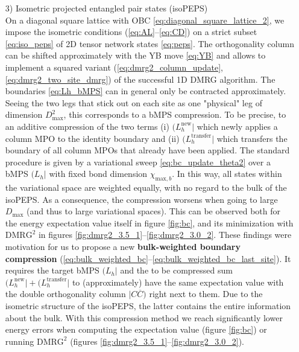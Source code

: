 \begin{enumerate}
	\newpage
	\item[3)] Isometric projected entangled pair states (isoPEPS) \\[0.3em]
	On a diagonal square lattice with OBC \eqref{eq:diagonal_square_lattice_2}, we impose the isometric conditions (\ref{eq:AL}--\ref{eq:CD}) on a strict subset \eqref{eq:iso_peps} of 2D tensor network states \eqref{eq:peps}. The orthogonality column can be shifted approximately with the YB move \eqref{eq:YB} and allows to implement a squared variant (\ref{eq:dmrg2_column_update}, \ref{eq:dmrg2_two_site_dmrg}) of the successful 1D DMRG algorithm. The boundaries \eqref{eq:Lh_bMPS} can in general only be contracted approximately. Seeing the two legs that stick out on each site as one "physical" leg of dimension $D_{\text{max}}^2$, this corresponds to a bMPS compression. To be precise, to an additive compression of the two terms (i) $(L_h^{\text{new}} \vert$ which newly applies a column MPO to the identity boundary and (ii) $(L_h^{\text{transfer}} \vert$ which transfers the boundary of all column MPOs that already have been applied. The standard procedure is given by a variational sweep \eqref{eq:bc_update_theta2} over a bMPS $( L_h \vert$ with fixed bond dimension $\chi_{\text{max},b}$. In this way, all states within the variational space are weighted equally, with no regard to the bulk of the isoPEPS. As a consequence, the compression worsens when going to large $D_{\text{max}}$ (and thus to large variational spaces). This can be observed both for the energy expectation value itself in figure \ref{fig:bc}, and its minimization with $\text{DMRG}^2$ in figures \ref{fig:dmrg2_3.5_1}--\ref{fig:dmrg2_3.0_2}. These findings were motivation for us to propose a new \textbf{bulk-weighted boundary compression} (\ref{eq:bulk_weighted_bc}--\ref{eq:bulk_weighted_bc_last_site}). It requires the target bMPS $( L_h \vert$ and the to be compressed sum $(L_h^{\text{new}} \vert + (L_h^{\text{transfer}} \vert$ to (approximately) have the same expectation value with the double orthogonality column $\vert C \overline{C} )$ right next to them. Due to the isometric structure of the isoPEPS, the latter contains the entire information about the bulk. With this compression method we reach significantly lower energy errors when computing the expectation value (figure \ref{fig:bc}) or running $\text{DMRG}^2$ (figures \ref{fig:dmrg2_3.5_1}--\ref{fig:dmrg2_3.0_2}). \\

\end{enumerate}
